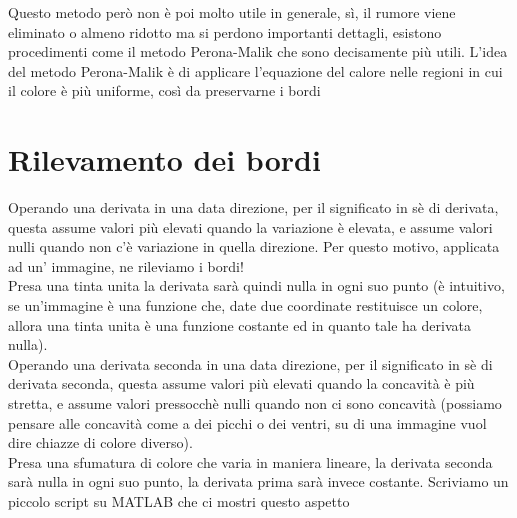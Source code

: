 Questo metodo però non è poi molto utile in generale, sì, il rumore viene eliminato o almeno ridotto ma si perdono importanti dettagli, esistono procedimenti come il metodo Perona-Malik che sono decisamente più utili. L'idea del metodo Perona-Malik è di applicare l'equazione del calore nelle regioni in cui il colore è più uniforme, così da preservarne i bordi\\


\section{Rilevamento dei bordi}

Operando una derivata in una data direzione, per il significato in sè di derivata, questa assume valori più elevati quando la variazione è elevata, e assume valori nulli quando non c'è variazione in quella direzione. Per questo motivo, applicata ad un' immagine, ne rileviamo i bordi!\\
Presa una tinta unita la derivata sarà quindi nulla in ogni suo punto (è intuitivo, se un'immagine è una funzione che, date due coordinate restituisce un colore, allora una tinta unita è una funzione costante ed in quanto tale ha derivata nulla).\\
\vspace{1em}
Operando una derivata seconda in una data direzione, per il significato in sè di derivata seconda, questa assume valori più elevati quando la concavità è più stretta, e assume valori pressocchè nulli quando non ci sono concavità (possiamo pensare alle concavità come a dei picchi o dei ventri, su di una immagine vuol dire chiazze di colore diverso).\\
Presa una sfumatura di colore che varia in maniera lineare, la derivata seconda sarà nulla in ogni suo punto, la derivata prima sarà invece costante. 
Scriviamo un piccolo script su MATLAB che ci mostri questo aspetto

